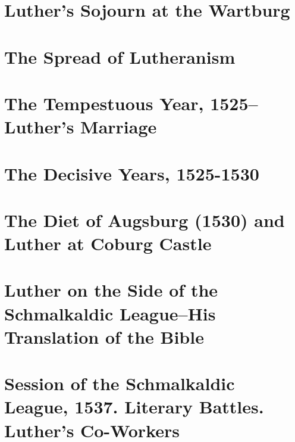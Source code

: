 \chapter{Luther’s Sojourn at the Wartburg}




\chapter{The Spread of Lutheranism}







\chapter{The Tempestuous Year, 1525--Luther’s Marriage}






\chapter{The Decisive Years, 1525-1530}









\chapter{The Diet of Augsburg (1530) and Luther at Coburg Castle}





\chapter{Luther on the Side of the Schmalkaldic League--His Translation of the Bible}





\chapter{Session of the Schmalkaldic League, 1537. Literary Battles. Luther’s Co-Workers}






